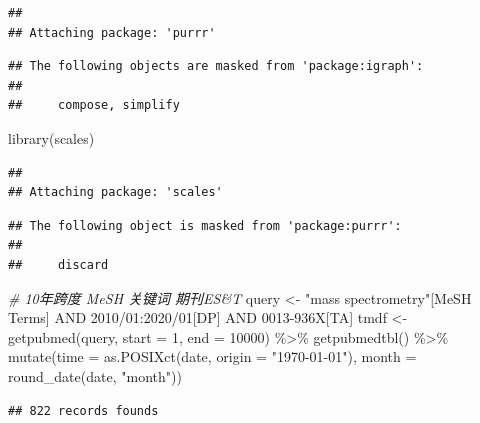 \documentclass[]{tufte-book}
\newenvironment{Shaded}{}{}
\newcommand{\AttributeTok}[1]{\textcolor[rgb]{0.49,0.56,0.16}{#1}}
\newcommand{\CommentTok}[1]{\textcolor[rgb]{0.38,0.63,0.69}{\textit{#1}}}
\newcommand{\DecValTok}[1]{\textcolor[rgb]{0.25,0.63,0.44}{#1}}
\newcommand{\FunctionTok}[1]{\textcolor[rgb]{0.02,0.16,0.49}{#1}}
\newcommand{\NormalTok}[1]{#1}
\newcommand{\OtherTok}[1]{\textcolor[rgb]{0.00,0.44,0.13}{#1}}
\newcommand{\SpecialCharTok}[1]{\textcolor[rgb]{0.25,0.44,0.63}{#1}}
\newcommand{\StringTok}[1]{\textcolor[rgb]{0.25,0.44,0.63}{#1}}
\begin{document}
\begin{verbatim}
## 
## Attaching package: 'purrr'
\end{verbatim}

\begin{verbatim}
## The following objects are masked from 'package:igraph':
## 
##     compose, simplify
\end{verbatim}

\begin{Shaded}
\begin{Highlighting}[]
\FunctionTok{library}\NormalTok{(scales)}
\end{Highlighting}
\end{Shaded}

\begin{verbatim}
## 
## Attaching package: 'scales'
\end{verbatim}

\begin{verbatim}
## The following object is masked from 'package:purrr':
## 
##     discard
\end{verbatim}

\begin{Shaded}
\begin{Highlighting}[]
\CommentTok{\# 10年跨度 MeSH 关键词 期刊ES\&T}
\NormalTok{query }\OtherTok{\textless{}{-}} \StringTok{\textquotesingle{}"mass spectrometry"[MeSH Terms] AND 2010/01:2020/01[DP] AND 0013{-}936X[TA]\textquotesingle{}}
\NormalTok{tmdf }\OtherTok{\textless{}{-}} \FunctionTok{getpubmed}\NormalTok{(query, }\AttributeTok{start =} \DecValTok{1}\NormalTok{, }\AttributeTok{end =} \DecValTok{10000}\NormalTok{) }\SpecialCharTok{\%\textgreater{}\%}
        \FunctionTok{getpubmedtbl}\NormalTok{() }\SpecialCharTok{\%\textgreater{}\%}
        \FunctionTok{mutate}\NormalTok{(}\AttributeTok{time =} \FunctionTok{as.POSIXct}\NormalTok{(date, }\AttributeTok{origin =} \StringTok{"1970{-}01{-}01"}\NormalTok{),}
         \AttributeTok{month =} \FunctionTok{round\_date}\NormalTok{(date, }\StringTok{"month"}\NormalTok{))}
\end{Highlighting}
\end{Shaded}

\begin{verbatim}
## 822 records founds
\end{verbatim}
\end{document}
